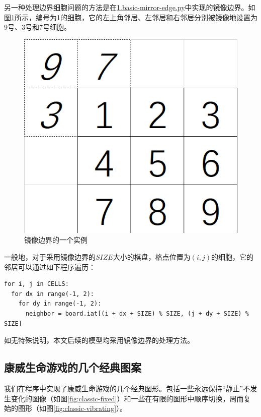\documentclass{ctexart}
\begin{document}
另一种处理边界细胞问题的方法是在\underline{1.basic-mirror-edge.py}中实现的镜像边界。如图\ref{fig:mirror-edge-example}所示，编号为1的细胞，它的左上角邻居、左邻居和右邻居分别被镜像地设置为9号、3号和7号细胞。

\begin{figure}[ht]
  \centering
  \includegraphics[scale=0.6]{mirror-edge-example.png}
  \caption{镜像边界的一个实例}
  \label{fig:mirror-edge-example}
\end{figure}

一般地，对于采用镜像边界的$SIZE$大小的棋盘，格点位置为$(i, j)$的细胞，它的邻居可以通过如下程序遍历：

\begin{lstlisting}[style = python]
for i, j in CELLS:
  for dx in range(-1, 2):
    for dy in range(-1, 2):
      neighbor = board.iat[(i + dx + SIZE) % SIZE, (j + dy + SIZE) % SIZE]
\end{lstlisting}

如无特殊说明，本文后续的模型均采用镜像边界的处理方法。

\subsection{康威生命游戏的几个经典图案}

我们在程序中实现了康威生命游戏的几个经典图形。包括一些永远保持“静止”不发生变化的图像（如图\ref{fig:classic-fixed}）和一些在有限的图形中顺序切换，周而复始的图形（如图\ref{fig:classic-vibrating}）。
\end{document}
